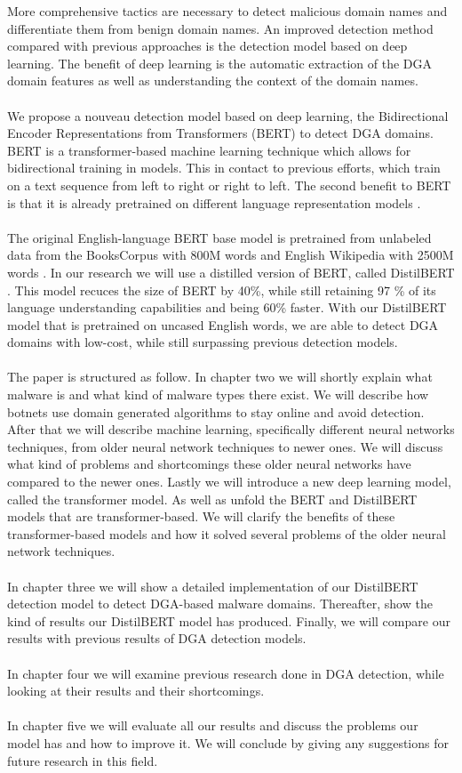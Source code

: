 More comprehensive tactics are necessary to detect malicious domain names and differentiate them from benign domain names. An improved detection method compared with previous approaches is the detection model based on deep learning. The benefit of deep learning is the automatic extraction of the DGA domain features as well as understanding the context of the domain names.\\\\ We propose a nouveau detection model based on deep learning, the Bidirectional Encoder Representations from Transformers (BERT) to detect DGA domains. BERT is a transformer-based machine learning technique which allows for bidirectional training in models. This in contact to previous efforts, which train on a text sequence from left to right or right to left. The second benefit to BERT is that it is already pretrained on different language representation models \cite{DBLP:journals/corr/abs-1810-04805}. \\\\ 
The original English-language BERT base model is pretrained from unlabeled data from the BooksCorpus \cite{BooksCorpus} with 800M words and English Wikipedia with 2500M words \cite{ColBERT}. In our research we will use a distilled version of BERT, called DistilBERT \cite{Sanh2019DistilBERTAD}. This model recuces the size of BERT by 40\%, while still retaining 97 \% of its language understanding capabilities and being 60\% faster. With our DistilBERT model that is pretrained on uncased English words, we are able to detect DGA domains with low-cost, while still surpassing previous detection models.
\pagebreak
\\\\
The paper is structured as follow. In chapter two we will shortly explain what malware is and what kind of malware types there exist. We will describe how botnets use domain generated algorithms to stay online and avoid detection. After that we will describe machine learning, specifically different neural networks techniques, from older neural network techniques to newer ones. We will discuss what kind of problems and shortcomings these older neural networks have compared to the newer ones. Lastly we will introduce a new deep learning model, called the transformer model. As well as unfold the BERT and DistilBERT models that are transformer-based. We will clarify the benefits of these transformer-based models and how it solved several problems of the older neural network techniques. \\\\
In chapter three we will show a detailed implementation of our DistilBERT detection model to detect DGA-based malware domains. Thereafter, show the kind of results our DistilBERT model has produced. Finally, we will compare our results with previous results of DGA detection models.\\\\
In chapter four we will examine previous research done in DGA detection, while looking at their results and their shortcomings.\\\\
In chapter five we will evaluate all our results and discuss the problems our model has and how to improve it. We will conclude by giving any suggestions for future research in this field.
